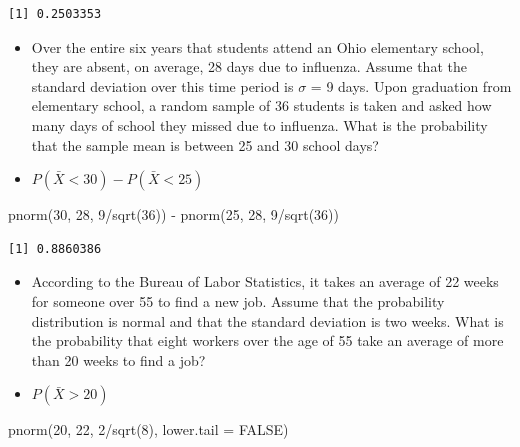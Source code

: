 \documentclass[
  letterpaper,
  DIV=11,
  numbers=noendperiod]{scrreprt}
\newenvironment{Shaded}{\begin{snugshade}}{\end{snugshade}}
\newcommand{\AttributeTok}[1]{\textcolor[rgb]{0.40,0.45,0.13}{#1}}
\newcommand{\ConstantTok}[1]{\textcolor[rgb]{0.56,0.35,0.01}{#1}}
\newcommand{\DecValTok}[1]{\textcolor[rgb]{0.68,0.00,0.00}{#1}}
\newcommand{\FunctionTok}[1]{\textcolor[rgb]{0.28,0.35,0.67}{#1}}
\newcommand{\NormalTok}[1]{\textcolor[rgb]{0.00,0.23,0.31}{#1}}
\newcommand{\SpecialCharTok}[1]{\textcolor[rgb]{0.37,0.37,0.37}{#1}}
\providecommand{\tightlist}{%
  \setlength{\itemsep}{0pt}\setlength{\parskip}{0pt}}\usepackage{longtable,booktabs,array}
\begin{document}
\begin{verbatim}
[1] 0.2503353
\end{verbatim}

\begin{itemize}
\tightlist
\item
  Over the entire six years that students attend an Ohio elementary
  school, they are absent, on average, 28 days due to influenza. Assume
  that the standard deviation over this time period is \(\sigma\) = 9
  days. Upon graduation from elementary school, a random sample of 36
  students is taken and asked how many days of school they missed due to
  influenza. What is the probability that the sample mean is between 25
  and 30 school days?
\item
  \(P(\bar{X} < 30)-P(\bar{X} < 25)\)
\end{itemize}

\begin{Shaded}
\begin{Highlighting}[]
\FunctionTok{pnorm}\NormalTok{(}\DecValTok{30}\NormalTok{, }\DecValTok{28}\NormalTok{, }\DecValTok{9}\SpecialCharTok{/}\FunctionTok{sqrt}\NormalTok{(}\DecValTok{36}\NormalTok{)) }\SpecialCharTok{{-}} \FunctionTok{pnorm}\NormalTok{(}\DecValTok{25}\NormalTok{, }\DecValTok{28}\NormalTok{, }\DecValTok{9}\SpecialCharTok{/}\FunctionTok{sqrt}\NormalTok{(}\DecValTok{36}\NormalTok{))}
\end{Highlighting}
\end{Shaded}

\begin{verbatim}
[1] 0.8860386
\end{verbatim}

\begin{itemize}
\tightlist
\item
  According to the Bureau of Labor Statistics, it takes an average of 22
  weeks for someone over 55 to find a new job. Assume that the
  probability distribution is normal and that the standard deviation is
  two weeks. What is the probability that eight workers over the age of
  55 take an average of more than 20 weeks to find a job?
\item
  \(P(\bar{X} >20)\)
\end{itemize}

\begin{Shaded}
\begin{Highlighting}[]
\FunctionTok{pnorm}\NormalTok{(}\DecValTok{20}\NormalTok{, }\DecValTok{22}\NormalTok{, }\DecValTok{2}\SpecialCharTok{/}\FunctionTok{sqrt}\NormalTok{(}\DecValTok{8}\NormalTok{), }\AttributeTok{lower.tail =} \ConstantTok{FALSE}\NormalTok{)}
\end{Highlighting}
\end{Shaded}
\end{document}
